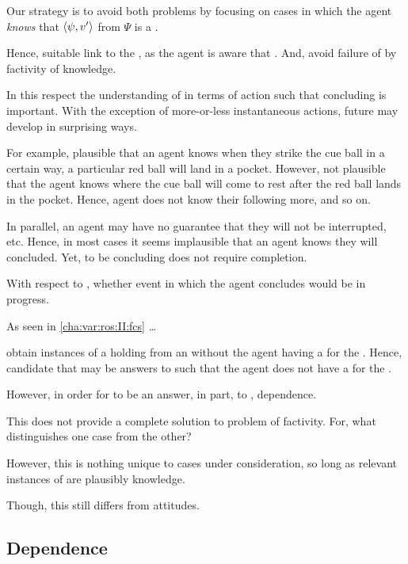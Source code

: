 \begin{note}
  Our strategy is to avoid both problems by focusing on cases in which the agent \emph{knows} that \(\langle \psi, v' \rangle\) from \(\Psi\) is a \fc{}.

  Hence, suitable link to the \agpe{}, as the agent is aware that \fc{}.
  And, avoid failure of \fc{} by factivity of knowledge.

  In this respect the understanding of  in terms of action such that concluding is important.
  With the exception of more-or-less instantaneous actions, future may develop in surprising ways.

  For example, plausible that an agent knows when they strike the cue ball in a certain way, a particular red ball will land in a pocket.
  However, not plausible that the agent knows where the cue ball will come to rest after the red ball lands in the pocket.
  Hence, agent does not know their following more, and so on.

  In parallel, an agent may have no guarantee that they will not be interrupted, etc.
  Hence, in most cases it seems implausible that an agent knows they will concluded.
  Yet, to be concluding does not require completion.

  With respect to \fc{}, whether event in which the agent concludes would be in progress.

  As seen in \autoref{cha:var:ros:II:fcs} \dots

   obtain instances of a  holding from an \agpe{} without the agent having a  for the .
  Hence, candidate \ros{} that may be answers to \qWhyVnP{} such that the agent does not have a  for the .

  However, in order for \ros{} to be an answer, in part, to \qWhyVnP{}, dependence.
\end{note}

\begin{note}
  This does not provide a complete solution to problem of factivity.
  For, what distinguishes one case from the other?

  However, this is nothing unique to cases under consideration, so long as relevant instances of \fc{} are plausibly knowledge.

  Though, this still differs from attitudes.

\end{note}

\subsection{Dependence}

